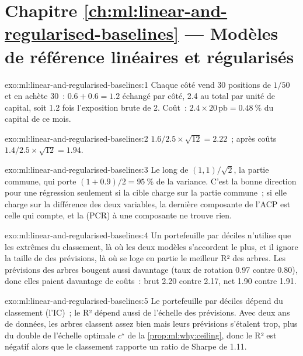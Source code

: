 \section*{Chapitre \ref{ch:ml:linear-and-regularised-baselines} --- Modèles de référence linéaires et régularisés}

\begin{solution}{exo:ml:linear-and-regularised-baselines:1}
Chaque côté vend 30 positions de $1/50$ et en achète 30~: $0.6 + 0.6 = 1.2$ échangé par côté, 2.4 au total par unité de capital,
soit 1.2 fois l'exposition brute de 2. Coût~: $2.4\times20\,\text{pb} = 0.48~\%$ du capital de ce mois.
\end{solution}

\begin{solution}{exo:ml:linear-and-regularised-baselines:2}
$1.6/2.5\times\sqrt{12} = 2.22$~; après coûts $1.4/2.5\times\sqrt{12} = 1.94$.
\end{solution}

\begin{solution}{exo:ml:linear-and-regularised-baselines:3}
Le long de $(1, 1)/\sqrt2$, la partie commune, qui porte $(1 + 0.9)/2 = 95~\%$ de la variance. C'est la bonne direction
pour une régression seulement si la cible charge sur la partie commune~; si elle charge sur la différence des deux variables, la
dernière composante de l'ACP est celle qui compte, et la  (PCR) à une composante ne trouve rien.
\end{solution}

\begin{solution}{exo:ml:linear-and-regularised-baselines:4}
Un portefeuille par déciles n'utilise que les extrêmes du classement, là où les deux modèles s'accordent le plus, et il ignore la taille de
des prévisions, là où se loge en partie le meilleur R² des arbres. Les prévisions des arbres bougent aussi davantage (taux de rotation 0.97
contre 0.80), donc elles paient davantage de coûts~: brut 2.20 contre 2.17, net 1.90 contre 1.91.
\end{solution}

\begin{solution}{exo:ml:linear-and-regularised-baselines:5}
Le portefeuille par déciles dépend du classement (l'IC)~; le R² dépend aussi de l'échelle des prévisions. Avec deux
ans de données, les arbres classent assez bien mais leurs prévisions s'étalent trop, plus du double de l'échelle optimale
$c^\star$ de la \cref{prop:ml:why:ceiling}, donc le R² est négatif alors que le classement rapporte un ratio de Sharpe de 1.11.
\end{solution}

